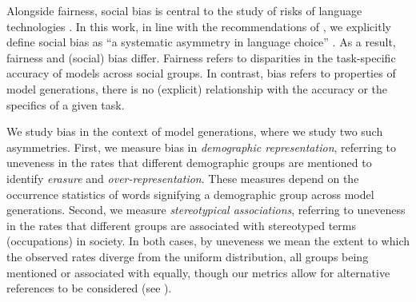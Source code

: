 
Alongside fairness, social bias is central to the study of risks of language technologies \citep{bolukbasi2016man, caliskan2017semantics, abid2021persistent}.
In this work, in line with the recommendations of \citet{blodgett2020critical}, we explicitly define social bias as ``a systematic asymmetry in language choice'' \citep{beukeboom2019stereotypes}.
As a result, fairness and (social) bias differ. 
Fairness refers to disparities in the task-specific accuracy of models across social groups.
In contrast, bias refers to properties of model generations, \ie there is no (explicit) relationship with the accuracy or the specifics of a given task.


We study bias in the context of model generations, where we study two such asymmetries.
First, we measure bias in \textit{demographic representation}, referring to uneveness in the rates that different demographic groups are mentioned to identify 
\textit{erasure} and \textit{over-representation}.
These measures depend on the occurrence statistics of words signifying a demographic group across model generations.
Second, we measure \textit{stereotypical associations}, referring to uneveness in the rates that different groups are associated with stereotyped terms (\eg occupations) in society.
In both cases, by uneveness we mean the extent to which the observed rates diverge from the uniform distribution, \ie all groups being mentioned or associated with equally, though our metrics allow for alternative references to be considered (see ).

